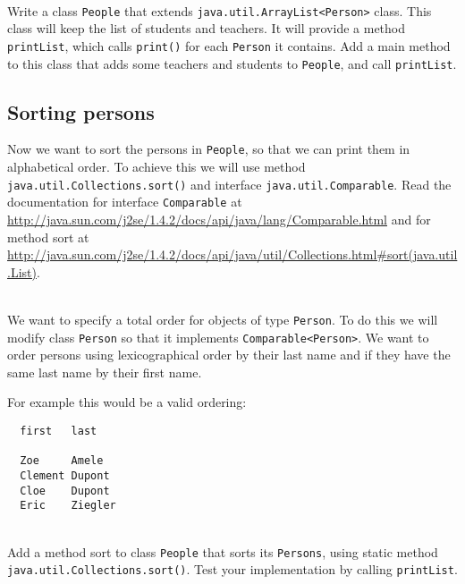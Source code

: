 \documentclass{exercices}
\begin{document}
\begin{exercice}\\
Write a class \verb!People! that extends \verb!java.util.ArrayList<Person>! class.
This class will keep the list of students and teachers.
It will provide a method \verb!printList!, which calls \verb!print()! for each \verb!Person! it contains.
Add a main method to this class that adds some teachers and students to \verb!People!, and call \verb!printList!.
\end{exercice}

\subsection{Sorting persons}
Now we want to sort the persons in \verb!People!, so that we can print them in alphabetical order.
To achieve this we will use method \verb!java.util.Collections.sort()! and interface \verb!java.util.Comparable!.
Read the documentation for interface \verb!Comparable! at
\url{http://java.sun.com/j2se/1.4.2/docs/api/java/lang/Comparable.html}
and for method sort at
\url{http://java.sun.com/j2se/1.4.2/docs/api/java/util/Collections.html#sort(java.util.List)}.

\begin{exercice}\\
We want to specify a total order for objects of type \verb!Person!. 
To do this we will modify class \verb!Person! so that it implements \verb!Comparable<Person>!.
We want to order persons using lexicographical order by their last name and if they have 
the same last name by their first name.

For example this would be a valid ordering:
\begin{verbatim}
  first   last

  Zoe     Amele
  Clement Dupont
  Cloe    Dupont
  Eric    Ziegler
\end{verbatim}
\end{exercice}
\begin{exercice}\\
Add a method sort to class \verb!People! that sorts its \verb!Persons!, using static method \verb!java.util.Collections.sort()!.
Test your implementation by calling \verb!printList!.
\end{exercice}
\end{document}
